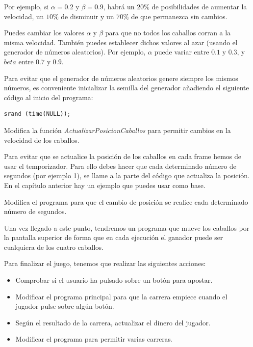 Por ejemplo, si $\alpha=0.2$ y $\beta=0.9$, habrá un $20\%$ de posibilidades de aumentar la velocidad, un $10\%$ de disminuir y un $70\%$ de que permanezca sin cambios.
  
Puedes cambiar los valores $\alpha$ y $\beta$ para que no todos los caballos corran a la misma velocidad. También puedes establecer dichos valores al azar (usando el generador de números aleatorios). Por ejemplo, $\alpha$ puede variar entre $0.1$ y $0.3$, y $beta$ entre $0.7$ y $0.9$.

Para evitar que el generador de números aleatorios genere siempre los mismos números, es conveniente inicializar la semilla del generador añadiendo el siguiente código al inicio del programa:

\begin{example}
\begin{lstlisting}
srand (time(NULL));
\end{lstlisting}
\end{example}
		
\begin{exercise}
	 Modifica la función \textit{ActualizarPosicionCaballos} para permitir cambios en la velocidad de los caballos.
\end{exercise}

Para evitar que se actualice la posición de los caballos en cada frame hemos de usar el temporizador. Para ello debes hacer que cada determinado número de segundos (por ejemplo 1), se llame a la parte del código que actualiza la posición. En el capítulo anterior hay un ejemplo que puedes usar como base.

\begin{exercise}
	Modifica el programa para que el cambio de posición se realice cada determinado número de segundos.
\end{exercise}

Una vez llegado a este punto, tendremos un programa que mueve los caballos por la pantalla superior de forma que en cada ejecución el ganador puede ser cualquiera de los cuatro caballos.

Para finalizar el juego, tenemos que realizar las siguientes acciones:

\begin{itemize}
\item Comprobar si el usuario ha pulsado sobre un botón para apostar. 
\item Modificar el programa principal para que la carrera empiece cuando el jugador pulse sobre algún botón.
\item Según el resultado de la carrera, actualizar el dinero del jugador.
\item Modificar el programa para permitir varias carreras.
\end{itemize}

